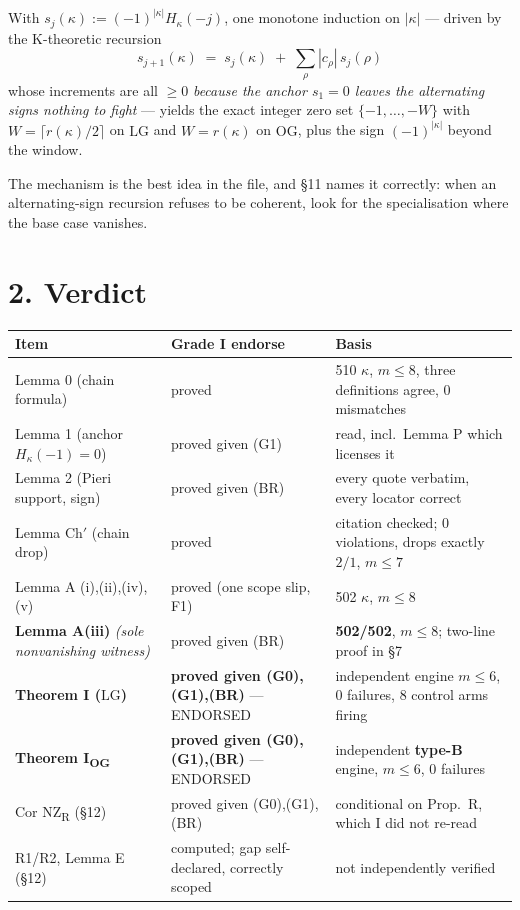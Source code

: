 \documentclass[11pt,a4paper]{article}
\theoremstyle{remark}
\newcommand{\LG}{\mathrm{LG}}
\newcommand{\OG}{\mathrm{OG}}
\begin{document}
With $s_j(\kappa) := (-1)^{|\kappa|}H_\kappa(-j)$, one monotone induction on $|\kappa|$ ---
driven by the K-theoretic recursion
\[
  s_{j+1}(\kappa) \;=\; s_j(\kappa) \;+\; \sum_\rho |c_\rho|\, s_j(\rho)
  \tag{$\star$}
\]
whose increments are all $\ge 0$ \emph{because the anchor $s_1=0$ leaves the alternating signs
nothing to fight} --- yields the exact integer zero set $\{-1,\dots,-W\}$ with
$W=\lceil r(\kappa)/2\rceil$ on $\LG$ and $W=r(\kappa)$ on $\OG$, plus the sign
$(-1)^{|\kappa|}$ beyond the window.

The mechanism is the best idea in the file, and \S11 names it correctly: when an
alternating-sign recursion refuses to be coherent, look for the specialisation where the base
case vanishes.

\section*{2. Verdict}

\begin{center}
\small
\begin{tabular}{p{3.0cm}p{3.5cm}p{6.4cm}}
\toprule
\textbf{Item} & \textbf{Grade I endorse} & \textbf{Basis} \\
\midrule
Lemma 0 (chain formula) & proved & 510 $\kappa$, $m\le8$, three definitions agree, 0 mismatches \\
Lemma 1 (anchor $H_\kappa(-1)=0$) & proved given (G1) & read, incl.\ Lemma P which licenses it \\
Lemma 2 (Pieri support, sign) & proved given (BR) & every quote verbatim, every locator correct \\
Lemma Ch$'$ (chain drop) & proved & citation checked; 0 violations, drops exactly $2/1$, $m\le7$ \\
Lemma A (i),(ii),(iv),(v) & proved (one scope slip, F1) & 502 $\kappa$, $m\le8$ \\
\textbf{Lemma A(iii)} \emph{(sole nonvanishing witness)} & proved given (BR) & \textbf{502/502}, $m\le8$; two-line proof in \S7 \\
\textbf{Theorem I ($\LG$)} & \textbf{proved given (G0),(G1),(BR)} --- ENDORSED & independent engine $m\le6$, 0 failures, 8 control arms firing \\
\textbf{Theorem I\textsubscript{OG}} & \textbf{proved given (G0),(G1),(BR)} --- ENDORSED & independent \textbf{type-B} engine, $m\le6$, 0 failures \\
Cor NZ\textsubscript{R} (\S12) & proved given (G0),(G1),(BR) & conditional on Prop.\ R, which I did not re-read \\
R1/R2, Lemma E (\S12) & computed; gap self-declared, correctly scoped & not independently verified \\
\bottomrule
\end{tabular}
\end{center}
\end{document}
